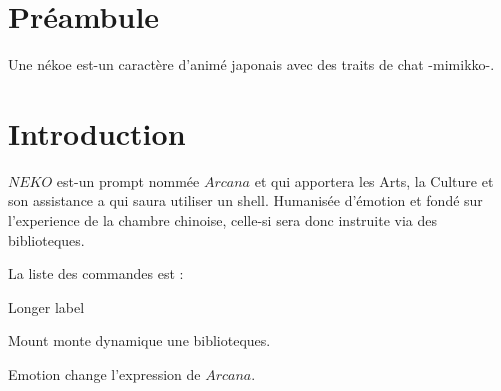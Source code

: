 \documentclass[french]{article}
\newcommand{\name}{\textit{Arcana}}
\newcommand{\program}{\textit{NEKO}}
\begin{document}
\tableofcontents

\section{Préambule}

Une nékoe est-un caractère d'animé japonais avec des traits de chat -mimikko-.


\section{Introduction}

$\program$ est-un prompt nommée $\name$ et qui apportera les Arts, la Culture et son assistance a qui saura utiliser un shell.
Humanisée d’émotion et fondé sur l’experience de la chambre chinoise, celle-si sera donc instruite via des biblioteques.

La liste des commandes est :

\begin{labeling}{Longer label\quad}
\item[Mount] monte dynamique une biblioteques.
\item[Emotion] change l'expression de $\name$.
\end{labeling}

\end{document}
